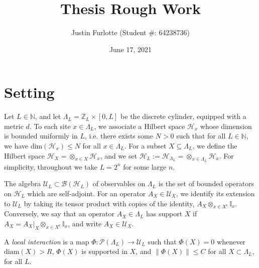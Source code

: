 \documentclass[12pt, letterpaper]{article}
\title{Thesis Rough Work}
\author{Justin Furlotte (Student \#: 64238736)}
\date{June 17, 2021}
\begin{document}
\begin{titlepage}
\maketitle
\end{titlepage}

\newtheorem{theorem}{Theorem}
\newtheorem{corollary}{Corollary}
\newtheorem{lemma}{Lemma}
\newtheorem{proposition}{Proposition}
\newtheorem{assumption}{Assumption}
 
\newcommand{\C}{\mathbb{C}}
\newcommand{\Tr}{\text{Tr}}
\newcommand{\eps}{\varepsilon}
\newcommand{\R}{\mathbb{R}}
\newcommand{\N}{\mathbb{N}}
\newcommand{\Z}{\mathbb{Z}}
\newcommand{\norm}[1]{\lVert #1 \rVert}
\newcommand{\One}{\mathbbm{1}}
\newcommand{\Var}{\text{Var}}
\newcommand{\F}{\mathcal{F}}
\newcommand{\G}{\mathcal{G}}
\newcommand{\U}{\mathcal{U}}


\graphicspath{ {c:/user/justin/grad school/Thesis} }

\section{Setting}

Let $L\in\N$, and let $\Lambda_L = \Z_L \times [0,L]$ be the discrete cylinder, equipped with a metric $d$. To each site $x \in \Lambda_L$, we associate a Hilbert space $\mathcal{H}_x$ whose dimension is bounded uniformly in $L$, i.e. there exists some $N>0$ such that for all $L \in \N$, we have $\text{dim}(\mathcal{H}_x) \leq N$ for all $x \in \Lambda_L$. For a subset $X \subseteq \Lambda_L$, we define the Hilbert space $\mathcal{H}_X = \otimes_{x \in X} \mathcal{H}_x$, and we set $\mathcal{H}_L := \mathcal{H}_{\Lambda_L} = \otimes_{x \in \Lambda_L}\mathcal{H}_x$. For simplicity, throughout we take $L = 2^n$ for some large $n$.

The algebra $\U_L \subset \mathcal{B}(\mathcal{H}_L)$ of observables on $\Lambda_L$ is the set of bounded operators on $\mathcal{H}_L$ which are self-adjoint. For an operator $A_X \in \U_X$, we identify its extension to $\U_L$ by taking its tensor product with copies of the identity, $A_X \otimes_{x \in X^\mathsf{c}} \mathbb{I}_x$. Conversely, we say that an operator $A_X \in \Lambda_L$ has support $X$ if $A_X = A_X|_{X} \otimes_{x \in X^\mathsf{c}} \mathbb{I}_x$, and write $A_X \in \U_X$.

A \textit{local interaction} is a map $\Phi : \mathcal{P}(\Lambda_L) \to \U_L$ such that $\Phi(X) = 0$ whenever $\text{diam}(X) > R$, $\Phi(X)$ is supported in $X$, and $\norm{\Phi(X)} \leq C$ for all $X \subset \Lambda_L$, for all $L$.
\end{document}
